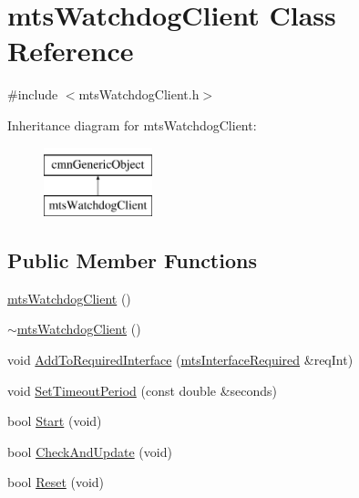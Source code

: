 \hypertarget{classmts_watchdog_client}{}\section{mts\+Watchdog\+Client Class Reference}
\label{classmts_watchdog_client}


{\ttfamily \#include $<$mts\+Watchdog\+Client.\+h$>$}

Inheritance diagram for mts\+Watchdog\+Client\+:\begin{figure}[H]
\begin{center}
\leavevmode
\includegraphics[height=2.000000cm]{dc/d03/classmts_watchdog_client}
\end{center}
\end{figure}
\subsection*{Public Member Functions}
\begin{DoxyCompactItemize}
\item 
\hyperlink{classmts_watchdog_client_a89ea1e18dd8148b42355cf863ce10c45}{mts\+Watchdog\+Client} ()
\item 
\hyperlink{classmts_watchdog_client_accbf3feab5979c90424cdd5e1bf5fbcb}{$\sim$mts\+Watchdog\+Client} ()
\item 
void \hyperlink{classmts_watchdog_client_a3f3698d2ed1d0e4de2436acd3baff029}{Add\+To\+Required\+Interface} (\hyperlink{classmts_interface_required}{mts\+Interface\+Required} \&req\+Int)
\item 
void \hyperlink{classmts_watchdog_client_a4f95073afcc8c345aa04cf80d29d4b9c}{Set\+Timeout\+Period} (const double \&seconds)
\item 
bool \hyperlink{classmts_watchdog_client_a8b6b2b18d602ca0bd8ddde6364ea5932}{Start} (void)
\item 
bool \hyperlink{classmts_watchdog_client_af7599c2def040faf6ed0b931effe573d}{Check\+And\+Update} (void)
\item 
bool \hyperlink{classmts_watchdog_client_aa8be0e6aef6566d29a69bcd7a74d22bc}{Reset} (void)
\end{DoxyCompactItemize}
